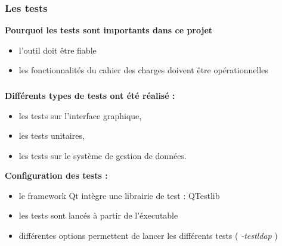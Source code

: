 \begin{frame}
\frametitle{Les tests}
\begin{block}{\textbf{Pourquoi les tests sont importants dans ce projet}}
\begin{itemize}
\item l'outil doit être fiable
\item les fonctionnalités du cahier des charges doivent être opérationnelles
\end{itemize}
\end{block}
\end{frame}

\begin{frame}
\frametitle{}
\begin{block}{\textbf{Différents types de tests ont été réalisé : }}
\begin{itemize}
\item les tests sur l'interface graphique,
\item les tests unitaires,
\item les tests sur le système de gestion de données.
\end{itemize}
\end{block}
\begin{block}{\textbf{Configuration des tests : }}
\begin{itemize}
\item le framework Qt intègre une librairie de test : QTestlib
\item les tests sont lancés à partir de l'éxecutable
\item différentes options permettent de lancer les différents tests ( \emph{-testldap} )
\end{itemize}
\end{block}
\end{frame}


